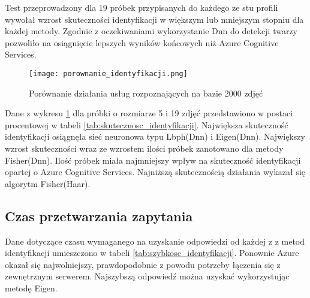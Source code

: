 Test przeprowadzony dla 19 próbek przypisanych do każdego ze stu profili wywołał  wzrost skuteczności identyfikacji w większym lub mniejszym stopniu dla każdej metody. Zgodnie z oczekiwaniami wykorzystanie Dnn do detekcji twarzy pozwoliło na osiągnięcie lepszych wyników końcowych niż Azure Cognitive Services.
\begin{figure}[H]
	\centering
	\texttt{[image: porownanie\_identyfikacji.png]}
	\caption{Porównanie działania usług rozpoznających na bazie 2000 zdjęć}
	\label{fig:porownanie_identyfikator}
\end{figure}
Dane z wykresu \ref{fig:porownanie_identyfikator} dla próbki o rozmiarze 5 i 19 zdjęć przedstawiono w postaci procentowej w tabeli \ref{tab:skutecznosc_identyfikacji}.
Największa skuteczność identyfikacji osiągnęła sieć neuronowa typu Lbph(Dnn) i Eigen(Dnn). Największy wzrost skuteczności wraz ze wzrostem ilości próbek zanotowano dla metody Fisher(Dnn). Ilość próbek miała najmniejszy wpływ na skuteczność identyfikacji opartej o Azure Cognitive Services. Najniższą skutecznością działania wykazał się algorytm Fisher(Haar).

\begin{table}[H]\label{tab:skutecznosc_identyfikacji}
	\centering
	\caption{Skuteczność identyfikacji wybranych metod w zależności od ilości próbek każdego profilu}
\end{table}

\subsection{Czas przetwarzania zapytania}
Dane dotyczące czasu wymaganego na uzyskanie odpowiedzi od każdej z z metod identyfikacji umieszczono w tabeli \ref{tab:szybkosc_identyfikacji}. Ponownie Azure okazał się najwolniejszy, prawdopodobnie z powodu potrzeby łączenia się z zewnętrznym serwerem. Najszybszą odpowiedź można uzyskać wykorzystując metodę Eigen.

